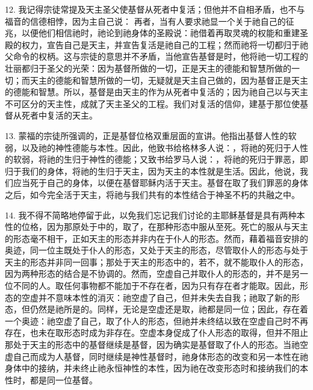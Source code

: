12. 我记得宗徒常提及天主圣父使基督从死者中复活；但他并不自相矛盾，也不与福音的信德相悖，因为主自己说： 再者，当有人要求祂显一个关于祂自己的征兆，以便他们相信祂时，祂论到祂身体的圣殿说：祂借着再取灵魂的权能和重建圣殿的权力，宣告自己是天主，并宣告复活是祂自己的工程；然而祂将一切都归于祂父命令的权柄。这与宗徒的意思并不矛盾，当他宣告基督是时，他将祂一切工程的壮丽都归于圣父的光荣：因为基督所做的一切，正是天主的德能和智慧所做的一切；而天主的德能和智慧所做的一切，无疑就是天主自己做的，因为基督正是天主的德能和智慧。所以，基督是由天主的作为从死者中复活的；因为祂自己以与天主不可区分的天主性，成就了天主圣父的工程。我们对复活的信仰，建基于那位使基督从死者中复活的天主。\par

13. 蒙福的宗徒所强调的，正是基督位格双重层面的宣讲。他指出基督人性的软弱，以及祂的神性德能与本性。因此，他致书给格林多人说：，将祂的死归于人性的软弱，将祂的生归于神性的德能；又致书给罗马人说：，将祂的死归于罪恶，即归于我们的身体，将祂的生归于天主，因为天主的本性就是生活。因此，他说，我们应当死于自己的身体，以便在基督耶稣内活于天主。基督在取了我们罪恶的身体之后，如今完全活于天主，将祂与我们共有的本性结合于神圣不朽的共融之中。\par

14. 我不得不简略地停留于此，以免我们忘记我们讨论的主耶稣基督是具有两种本性的位格，因为那原处于中的，取了，在那种形态中服从至死。死亡的服从与天主的形态毫不相干，正如天主的形态并非内在于仆人的形态。然而，藉着福音安排的奥迹，同一位主既处于仆人的形态，又处于天主的形态，尽管取仆人的形态与处于天主的形态并非同一回事；那处于天主的形态中的，若不，就不能取仆人的形态，因为两种形态的结合是不协调的。然而，空虚自己并取仆人的形态的，并不是另一位不同的人。取任何事物都不能加于不存在者，因为只有存在者才能取。因此，形态的空虚并不意味本性的消灭：祂空虚了自己，但并未失去自我；祂取了新的形态，但仍然是祂所是的。同样，无论是空虚还是取，祂都是同一位；因此，存在着一个奥迹：祂空虚了自己，取了仆人的形态，但祂并未终结以致在空虚自己时不再存在，也未在取形态时成为非存在。空虚本身促成了仆人形态的取得，但并不阻止那处于天主的形态中的基督继续是基督，因为确实是基督取了仆人的形态。当祂空虚自己而成为人基督，同时继续是神性基督时，祂身体形态的改变和另一本性在祂身体中的接纳，并未终止祂永恒神性的本性，因为祂在改变形态时和接纳我们的本性时，都是同一位基督。\par

